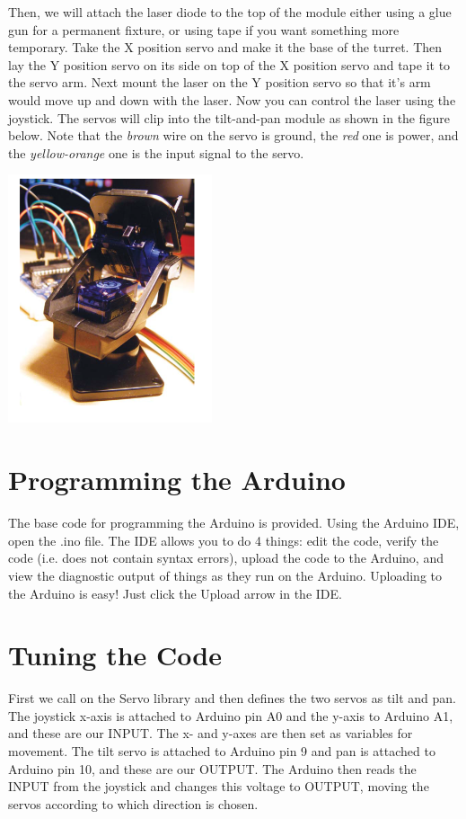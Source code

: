 \documentclass{article}
\begin{document}
Then, we will attach the laser diode to the top of the module either using a glue gun for a
permanent fixture, or using tape if you want something more temporary. Take the X position servo and
make it the base of the turret. Then lay the Y position servo on its side on top of the X position
servo and tape it to the servo arm. Next mount the laser on the Y position servo so that it’s arm
would move up and down with the laser. Now you can control the laser using the joystick. The servos
will clip into the tilt-and-pan module as shown in the figure below. Note that the \emph{brown} wire
on the servo is ground, the \emph{red} one is power, and the \emph{yellow-orange} one is the input
signal to the servo.

\begin{center}
\includegraphics[width=6cm]{laser.png}
\end{center}

\section{Programming the Arduino}
The base code for programming the Arduino is provided. Using the Arduino IDE, open the .ino file.
The IDE allows you to do 4 things: edit the code, verify the code (i.e. does not contain syntax
errors), upload the code to the Arduino, and view the diagnostic output of things as they run on the
Arduino.  Uploading to the Arduino is easy! Just click the Upload arrow in the IDE.

\section{Tuning the Code}
First we call on the Servo library and then defines the two servos as tilt and pan. The joystick
x-axis is attached to Arduino pin A0 and the y-axis to Arduino A1, and these are our INPUT. The x-
and y-axes are then set as variables for movement. The tilt servo is attached to Arduino pin 9 and
pan is attached to Arduino pin 10, and these are our OUTPUT. The Arduino then reads the INPUT from
the joystick and changes this voltage to OUTPUT, moving the servos according to which direction is
chosen.
\end{document}
